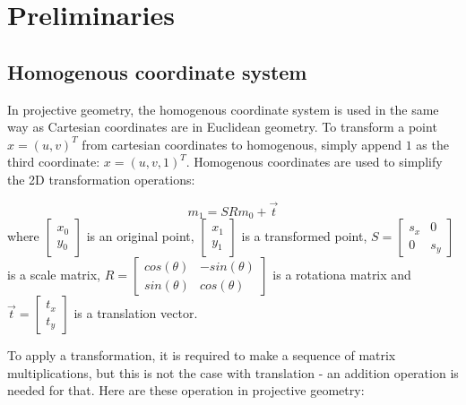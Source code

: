 \chapter{Preliminaries}

\label{chapter:preliminaries}
\section{Homogenous coordinate system}

In projective geometry, the homogenous coordinate system is used in the same way as Cartesian coordinates are in Euclidean geometry.
To transform a point $x=(u, v)^T$ from cartesian coordinates to homogenous, simply append $1$ as the third coordinate: $x=(u, v, 1)^T$.
Homogenous coordinates are used to simplify the 2D transformation operations: 


\begin{equation}
    m_1 = 
    S R
    m_0
    + \vec{t}
\end{equation}
where 
$\begin{bmatrix} x_0 \\ y_0 \end{bmatrix}$
is an original point,
$\begin{bmatrix} x_1 \\ y_1 \end{bmatrix}$
is a transformed point,
$S = \begin{bmatrix} s_x & 0 \\ 0 & s_y \end{bmatrix}$ 
is a scale matrix, 
$R = \begin{bmatrix} cos(\theta) & -sin(\theta) \\ sin(\theta) & cos(\theta) \end{bmatrix}$ 
is a rotationa matrix and 
$\vec{t} = \begin{bmatrix} t_x \\ t_y \end{bmatrix}$ 
is a translation vector.

To apply a transformation, it is required to make a sequence of matrix multiplications, but this is not the case with translation - an addition operation is needed for that. 
Here are these operation in projective geometry:

